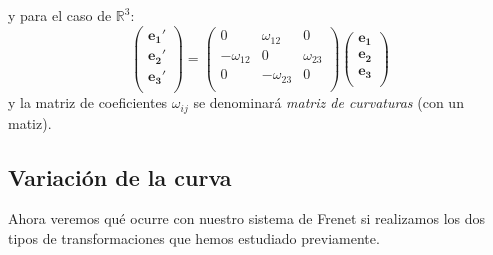 y para el caso de $\mathbb{R}^3$:
$$
\boxed{
\left ( 
\begin{array}{c}
     \mathbf{e_1}'  \\
     \mathbf{e_2}'  \\
     \mathbf{e_3}'  \\
\end{array}
\right )=\left ( 
\begin{array}{ccc}
    0 &\omega_{12} &0  \\
     -\omega_{12} &0 &\omega_{23}  \\
     0 &-\omega_{23} &0   \\
\end{array}
\right ) \left ( 
\begin{array}{c}
     \mathbf{e_1}  \\
     \mathbf{e_2}  \\
     \mathbf{e_3}  \\
\end{array}
\right )
}
$$
y la matriz de coeficientes $\omega_{ij}$ se denominará \emph{matriz de curvaturas} (con un matiz).\\

\subsection{Variación de la curva}

Ahora veremos qué ocurre con nuestro sistema de Frenet si realizamos los dos tipos de transformaciones que hemos estudiado previamente.


